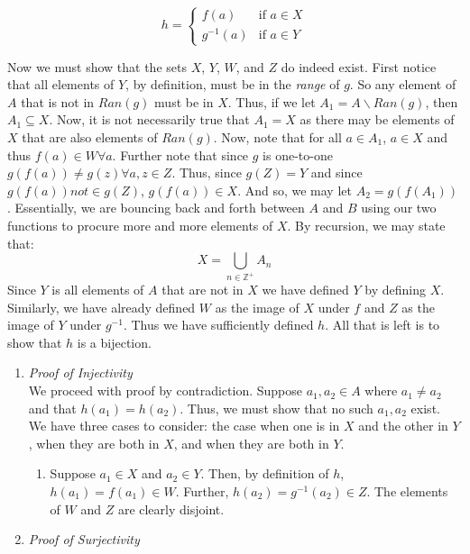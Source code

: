 \documentclass{article}
\begin{document}
\[
h=\begin{cases}
	f(a) & \text{if } a \in X \\
	g^{-1}(a) & \text{if } a \in Y
\end{cases}
\] 
\par Now we must show that the sets $X$, $Y$, $W$, and $Z$ do indeed exist. First notice that all elements of $Y$, by definition, must be in the \textit{range} of $g$. So any element of $A$ that is not in $Ran(g)$ must be in $X$. Thus, if we let $A_1=A \backslash Ran(g)$, then $A_1 \subseteq X$. Now, it is not necessarily true that $A_1=X$ as there may be elements of $X$ that are also elements of $Ran(g)$. Now, note that for all $a \in A_{1}$, $a \in X$ and thus $f(a) \in W \forall a$. Further note that since $g$ is one-to-one $g(f(a)) \not = g(z) \forall a,z \in Z$. Thus, since $g(Z)=Y$ and since $g(f(a)) not \in g(Z)$, $g(f(a)) \in X$. And so, we may let $A_2=g(f(A_1))$. Essentially, we are bouncing back and forth between $A$ and $B$ using our two functions to procure more and more elements of $X$. By recursion, we may state that:
\[
X=\bigcup_{n \in \mathbb{Z}^{+}} A_n
\]
Since $Y$ is all elements of $A$ that are not in $X$ we have defined $Y$ by defining $X$. Similarly, we have already defined $W$ as the image of $X$ under $f$ and $Z$ as the image of $Y$ under $g^{-1}$. Thus we have sufficiently defined $h$. All that is left is to show that $h$ is a bijection. 
\begin{enumerate}
\item \textit{Proof of Injectivity}
\\
We proceed with proof by contradiction. Suppose $a_1, a_2 \in A$ where $a_1 \not = a_2$ and that $h(a_1)=h(a_2)$. Thus, we must show that no such $a_1, a_2$ exist. We have three cases to consider: the case when one is in $X$ and the other in $Y$, when they are both in $X$, and when they are both in $Y$. 
	\begin{enumerate}
	\item Suppose $a_1 \in X$ and $a_2 \in Y$. Then, by definition of $h$, $h(a_1)=f(a_1)\in W$. Further, $h(a_2)=g^{-1}(a_2)\in Z$. The elements of $W$ and $Z$ are clearly disjoint. 
	\end{enumerate}
\item \textit{Proof of Surjectivity}
\end{enumerate}
\end{document}
